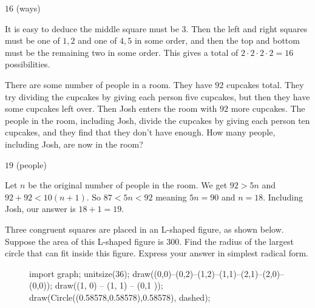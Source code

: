 \documentclass[11pt]{article}
\begin{document}
\begin{answer}
$\boxed{16}$ (ways)
\end{answer}

\begin{solution}
It is easy to deduce the middle square must be $3$. Then the left and right squares must be one of ${1,2}$ and one of ${4,5}$ in some order, and then the top and bottom must be the remaining two in some order. This gives a total of $2 \cdot 2 \cdot 2 \cdot 2 = \boxed{16}$ possibilities.
\end{solution}


\begin{problem}%
There are some number of people in a room. They have $92$ cupcakes total. They try dividing the cupcakes by giving each person five cupcakes, but then they have some cupcakes left over. Then Josh enters the room with $92$ more cupcakes. The people in the room, including Josh, divide the cupcakes by giving each person ten cupcakes, and they find that they don't have enough. How many people, including Josh, are now in the room?
\end{problem}

\begin{answer}
$\boxed{19}$ (people)
\end{answer}

\begin{solution}
Let $n$ be the original number of people in the room. We get $92 > 5n$ and $92 + 92 < 10(n+1)$. So $87 < 5n < 92$ meaning $5n = 90$ and $n = 18$. Including Josh, our answer is $18 + 1 = \boxed{19}$. 
\end{solution}


\begin{problem}
Three congruent squares are placed in an L-shaped figure, as shown below. Suppose the area of this L-shaped figure is $300$. Find the radius of the largest circle that can fit inside this figure. Express your answer in simplest radical form.  
\begin{figure}[h]
	\begin{center}
		\begin{asy}
			import graph;
			unitsize(36);
			draw((0,0)--(0,2)--(1,2)--(1,1)--(2,1)--(2,0)--(0,0));
			draw((1, 0) -- (1, 1) -- (0,1 ));
			draw(Circle((0.58578,0.58578),0.58578), dashed);
		\end{asy}
	\end{center}
\end{figure}
\end{problem}
\end{document}
